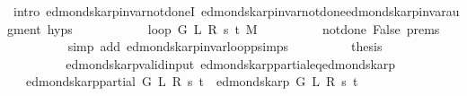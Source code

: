 \begin{isabellebody}
\ {\isacharparenleft}{\kern0pt}intro\ edmonds{\isacharunderscore}{\kern0pt}karp{\isacharunderscore}{\kern0pt}invar{\isacharunderscore}{\kern0pt}not{\isacharunderscore}{\kern0pt}done{\isacharunderscore}{\kern0pt}{}I{\isacharunderscore}{\kern0pt}{}\ edmonds{\isacharunderscore}{\kern0pt}karp{\isacharunderscore}{\kern0pt}invar{\isacharunderscore}{\kern0pt}not{\isacharunderscore}{\kern0pt}done{\isacharunderscore}{\kern0pt}{}{\isachardot}{\kern0pt}edmonds{\isacharunderscore}{\kern0pt}karp{\isacharunderscore}{\kern0pt}invar{\isacharunderscore}{\kern0pt}augment\ {\isachardoublequoteopen}{}{\isachardot}{\kern0pt}hyps{\isachardoublequoteclose}{\isacharparenright}{\kern0pt}\isanewline
\ \ \ \ \ \ \isamarkupfalse%
\ \isamarkupfalse%
\ {\isachardoublequoteopen}{\isachardot}{\kern0pt}{\isachardot}{\kern0pt}{\isachardot}{\kern0pt}\ {\isacharequal}{\kern0pt}\ loop{\isacharprime}{\kern0pt}\ G\ L\ R\ s\ t\ M{\isachardoublequoteclose}\isanewline
\ \ \ \ \ \ \ \ \isamarkupfalse%
\ not{\isacharunderscore}{\kern0pt}done{\isacharunderscore}{\kern0pt}{}\ False\ {\isachardoublequoteopen}{}{\isachardot}{\kern0pt}prems{\isachardoublequoteclose}\isanewline
\ \ \ \ \ \ \ \ \isamarkupfalse%
\ {\isacharparenleft}{\kern0pt}simp\ add{\isacharcolon}{\kern0pt}\ edmonds{\isacharunderscore}{\kern0pt}karp{\isacharunderscore}{\kern0pt}invar{\isachardot}{\kern0pt}loop{\isacharprime}{\kern0pt}{\isacharunderscore}{\kern0pt}psimps{\isacharparenright}{\kern0pt}\isanewline
\ \ \ \ \ \ \isamarkupfalse%
\ \isamarkupfalse%
\ {\isacharquery}{\kern0pt}thesis\isanewline
\ \ \ \ \ \ \ \ \isacommand{{\isachardot}{\kern0pt}}\isamarkupfalse%
\isanewline
\ \ \ \ \isamarkupfalse%
\isanewline
\ \ \isamarkupfalse%
\isanewline
{}\isamarkupfalse%
%
\endisatagproof
{\isafoldproof}%
%
\isadelimproof
\isanewline
%
\endisadelimproof
\isanewline
{}\isamarkupfalse%
\ {\isacharparenleft}{\kern0pt}\ edmonds{\isacharunderscore}{\kern0pt}karp{\isacharunderscore}{\kern0pt}valid{\isacharunderscore}{\kern0pt}input{\isacharparenright}{\kern0pt}\ edmonds{\isacharunderscore}{\kern0pt}karp{\isacharunderscore}{\kern0pt}partial{\isacharunderscore}{\kern0pt}eq{\isacharunderscore}{\kern0pt}edmonds{\isacharunderscore}{\kern0pt}karp{\isacharcolon}{\kern0pt}\isanewline
\ \ \ {\isachardoublequoteopen}edmonds{\isacharunderscore}{\kern0pt}karp{\isacharunderscore}{\kern0pt}partial\ G\ L\ R\ s\ t\ {\isacharequal}{\kern0pt}\ edmonds{\isacharunderscore}{\kern0pt}karp\ G\ L\ R\ s\ t{\isachardoublequoteclose}\isanewline

\end{isabellebody}
